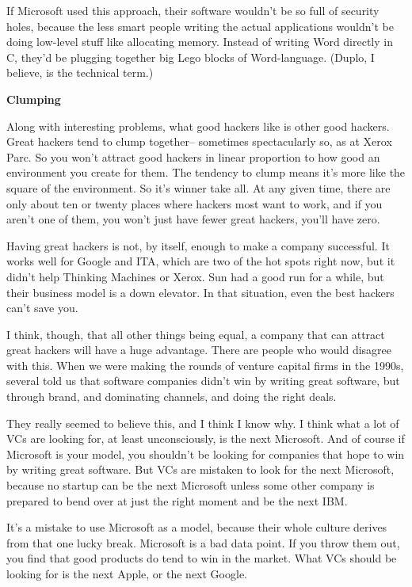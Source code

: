 \documentclass[12pt]{book}
\begin{document}
If Microsoft used this approach, their software wouldn't be so full of
security holes, because the less smart people writing the actual
applications wouldn't be doing low-level stuff like allocating memory.
Instead of writing Word directly in C, they'd be plugging together big
Lego blocks of Word-language. (Duplo, I believe, is the technical term.)

\textbf{Clumping}

Along with interesting problems, what good hackers like is other good
hackers. Great hackers tend to clump together-- sometimes spectacularly
so, as at Xerox Parc. So you won't attract good hackers in linear
proportion to how good an environment you create for them. The tendency
to clump means it's more like the square of the environment. So it's
winner take all. At any given time, there are only about ten or twenty
places where hackers most want to work, and if you aren't one of them,
you won't just have fewer great hackers, you'll have zero.

Having great hackers is not, by itself, enough to make a company
successful. It works well for Google and ITA, which are two of the hot
spots right now, but it didn't help Thinking Machines or Xerox. Sun had
a good run for a while, but their business model is a down elevator. In
that situation, even the best hackers can't save you.

I think, though, that all other things being equal, a company that can
attract great hackers will have a huge advantage. There are people who
would disagree with this. When we were making the rounds of venture
capital firms in the 1990s, several told us that software companies
didn't win by writing great software, but through brand, and dominating
channels, and doing the right deals.

They really seemed to believe this, and I think I know why. I think what
a lot of VCs are looking for, at least unconsciously, is the next
Microsoft. And of course if Microsoft is your model, you shouldn't be
looking for companies that hope to win by writing great software. But
VCs are mistaken to look for the next Microsoft, because no startup can
be the next Microsoft unless some other company is prepared to bend over
at just the right moment and be the next IBM.

It's a mistake to use Microsoft as a model, because their whole culture
derives from that one lucky break. Microsoft is a bad data point. If you
throw them out, you find that good products do tend to win in the
market. What VCs should be looking for is the next Apple, or the next
Google.
\end{document}
